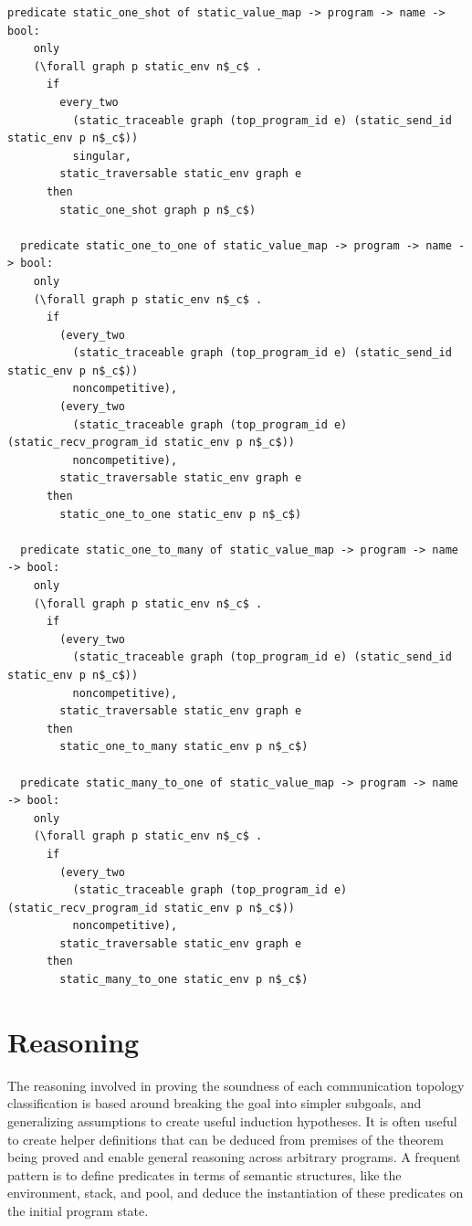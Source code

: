 \documentclass[10pt]{article}
\begin{document}
\begin{lstlisting}[language=logic, mathescape]
  predicate static_one_shot of static_value_map -> program -> name -> bool:
    only
    (\forall graph p static_env n$_c$ .
      if
        every_two
          (static_traceable graph (top_program_id e) (static_send_id static_env p n$_c$))
          singular,
        static_traversable static_env graph e
      then
        static_one_shot graph p n$_c$)

  predicate static_one_to_one of static_value_map -> program -> name -> bool:
    only
    (\forall graph p static_env n$_c$ .
      if
        (every_two
          (static_traceable graph (top_program_id e) (static_send_id static_env p n$_c$))
          noncompetitive), 
        (every_two
          (static_traceable graph (top_program_id e) (static_recv_program_id static_env p n$_c$))
          noncompetitive), 
        static_traversable static_env graph e
      then
        static_one_to_one static_env p n$_c$)

  predicate static_one_to_many of static_value_map -> program -> name -> bool:
    only
    (\forall graph p static_env n$_c$ .
      if
        (every_two
          (static_traceable graph (top_program_id e) (static_send_id static_env p n$_c$))
          noncompetitive),
        static_traversable static_env graph e
      then
        static_one_to_many static_env p n$_c$) 

  predicate static_many_to_one of static_value_map -> program -> name -> bool:
    only
    (\forall graph p static_env n$_c$ .
      if
        (every_two
          (static_traceable graph (top_program_id e) (static_recv_program_id static_env p n$_c$))
          noncompetitive),
        static_traversable static_env graph e
      then
        static_many_to_one static_env p n$_c$) 
\end{lstlisting}

\section{Reasoning}
The reasoning involved in proving the soundness of each communication topology classification
is based around breaking the goal into simpler subgoals, and generalizing assumptions to create
useful induction hypotheses.  It is often useful to
create helper definitions that can be deduced
from premises of the theorem being proved and enable
general reasoning across arbitrary programs.
A frequent pattern is to define
predicates in terms of semantic structures, like the environment, stack, and pool, and deduce 
the instantiation of these predicates on the initial program state. 
\end{document}
